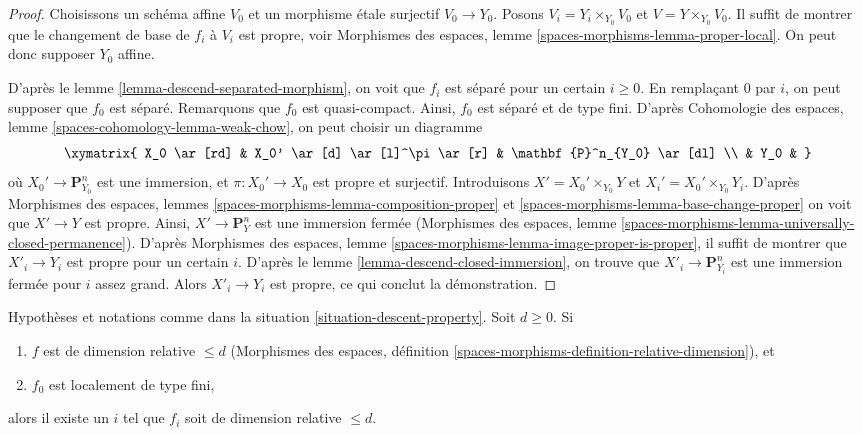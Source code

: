 \begin{proof}
Choisissons un schéma affine $V_0$ et un morphisme étale surjectif $V_0 \to Y_0$.
Posons $V_i = Y_i \times_{Y_0} V_0$ et $V = Y \times_{Y_0} V_0$.
Il suffit de montrer que le changement de base de $f_i$ à $V_i$ est
propre, voir Morphismes des espaces, lemme
\ref{spaces-morphisms-lemma-proper-local}.
On peut donc supposer $Y_0$ affine.

\medskip\noindent
D'après le lemme \ref{lemma-descend-separated-morphism}, on voit que
$f_i$ est séparé pour un certain $i \geq 0$. En remplaçant
$0$ par $i$, on peut supposer que $f_0$ est séparé.
Remarquons que $f_0$ est quasi-compact. Ainsi, $f_0$ est séparé et
de type fini. D'après
Cohomologie des espaces, lemme \ref{spaces-cohomology-lemma-weak-chow},
on peut choisir un diagramme
$$
\xymatrix{
X_0 \ar[rd] & X_0' \ar[d] \ar[l]^\pi \ar[r] & \mathbf{P}^n_{Y_0} \ar[dl] \\
& Y_0 &
}
$$
où $X_0' \to \mathbf{P}^n_{Y_0}$ est une immersion, et
$\pi : X_0' \to X_0$ est propre et surjectif. Introduisons
$X' = X_0' \times_{Y_0} Y$ et $X_i' = X_0' \times_{Y_0} Y_i$.
D'après Morphismes des espaces, lemmes
\ref{spaces-morphisms-lemma-composition-proper} et
\ref{spaces-morphisms-lemma-base-change-proper}
on voit que $X' \to Y$ est propre. Ainsi, $X' \to \mathbf{P}^n_Y$ est
une immersion fermée (Morphismes des espaces, lemme
\ref{spaces-morphisms-lemma-universally-closed-permanence}). D'après
Morphismes des espaces, lemme \ref{spaces-morphisms-lemma-image-proper-is-proper},
il suffit de montrer que $X'_i \to Y_i$ est propre pour un certain $i$.
D'après le lemme \ref{lemma-descend-closed-immersion},
on trouve que $X'_i \to \mathbf{P}^n_{Y_i}$ est
une immersion fermée pour $i$ assez grand. Alors $X'_i \to Y_i$
est propre, ce qui conclut la démonstration.
\end{proof}

\begin{lemma}
\label{lemma-eventually-relative-dimension}
Hypothèses et notations comme dans la situation \ref{situation-descent-property}.
Soit $d \geq 0$. Si
\begin{enumerate}
\item $f$ est de dimension relative $\leq d$
(Morphismes des espaces, définition
\ref{spaces-morphisms-definition-relative-dimension}), et
\item $f_0$ est localement de type fini,
\end{enumerate}
alors il existe un $i$ tel que $f_i$ soit de dimension relative $\leq d$.
\end{lemma}

